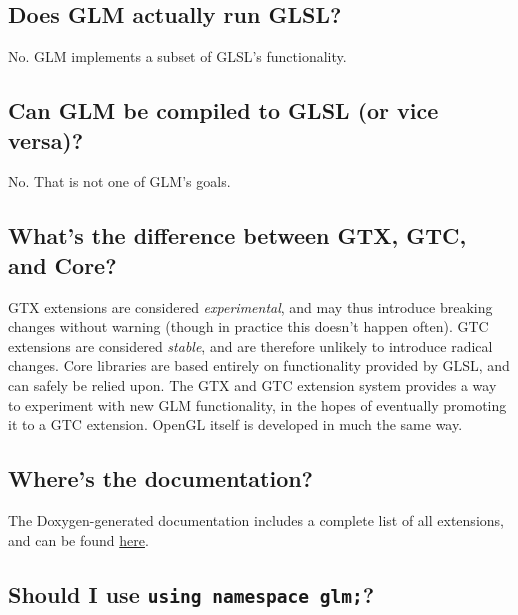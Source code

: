\documentclass{scrartcl}
\numberwithin{figure}{subsection}
\begin{document}
\subsection{Does GLM actually run GLSL?}

No.  GLM implements a subset of GLSL's functionality.

\subsection{Can GLM be compiled to GLSL (or vice versa)?}

No.  That is not one of GLM's goals.

\subsection{What's the difference between GTX, GTC, and Core?}

GTX extensions are considered \emph{experimental}, and may thus introduce breaking changes without warning (though in practice this doesn't happen often).  GTC extensions are considered \emph{stable}, and are therefore unlikely to introduce radical changes.  Core libraries are based entirely on functionality provided by GLSL, and can safely be relied upon.  The GTX and GTC extension system provides a way to experiment with new GLM functionality, in the hopes of eventually promoting it to a GTC extension.  OpenGL itself is developed in much the same way.

%
%

\subsection{Where's the documentation?}

The Doxygen-generated documentation includes a complete list of all extensions, and can be found \href{http://glm.g-truc.net/html/index.html}{here}.

\subsection{Should I use \texttt{using namespace glm;}?}
\end{document}
